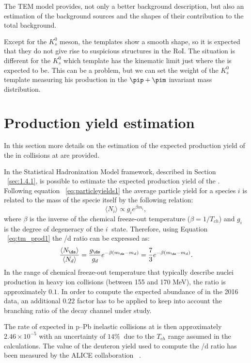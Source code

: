 The TEM model provides, not only a better background description, but also an estimation of
the background sources and the shapes of their contribution to the total background.

Except for the $K_{s}^{0}$ meson, the templates show a smooth shape, so it is expected that they do not give
rise to suspicious structures in the RoI. The situation is different for the $K_{s}^{0}$ which template has 
the kinematic limit just where the \ds is expected to be.
This can be a problem, but we can set the weight of the $K_{s}^{0}$ template measuring his production in the
$\pip+\pim$ invariant mass distribution.

%
%
\section{Production yield estimation} \label{sec:ds_production}

In this section more details on the estimation of the expected production yield of the \ds in \pPb
collisions at \sctev are provided.

In the Statistical Hadronization Model framework, described in Section ~\ref{sec:1.4.1}, is possible 
to estimate the expected production yield of the \ds. Following equation ~\ref{eq:particleyields1}
the average particle yield for a species $i$ is related to the mass of the specie itself by the 
following relation:
\begin{equation} \label{eq:tm_prod1}
    \langle N_{i} \rangle \propto g_{i} e^{\beta m_{i}},
\end{equation}
where $\beta$ is the inverse of the chemical freeze-out temperature ($\beta = 1/T_{ch}$) and 
$g_{i}\ $ is the degree of degeneracy of the $i\ $ state. 
Therefore, using Equation ~\ref{eq:tm_prod1} the \ds/d ratio can be expressed as:
\begin{equation} \label{eq:tm_prod2}
\frac{\langle N_{\ds} \rangle}{\langle N_d \rangle}=\frac{g_{\ds}}{g_d}e^{-\beta (m_{\ds} - m_d)}=\frac{7}{3}e^{-\beta (m_{\ds} - m_d)}.
\end{equation}
In the range of chemical freeze-out temperature that typically describe nuclei production in
heavy ion collisions (between 155 and 170 MeV), the ratio is approximately $0.1$.
In order to compute the expected abundance of \ds in the 2016 \pPb data, an additional 
$0.22$ factor has to be applied to keep into account the branching ratio of the \dstdecay
decay channel under study.

The rate of expected \dstdecay in p–Pb inelastic collisions at \sctev is then 
approximately $2.46\times10^{-5}$ with an uncertainty of $14\%\ $ due to the $T_{ch}$
range assumed in the calculations. The value of the deuteron yield used to compute the \ds/d
ratio has been measured by the ALICE collaboration ~\cite{deuteron_in_progress}.

